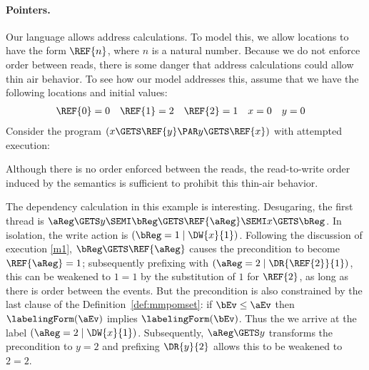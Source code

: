 \paragraph{Pointers.}
Our language allows address calculations.  To model this, we allow locations
to have the form $\REF{n}$, where $n$ is a natural number.  Because we do not
enforce order between reads, there is some danger that address calculations
could allow thin air behavior.   To see how our model addresses this, assume
that we have the following locations and initial values:
\begin{align*}
  \REF{0}&=0  &
  \REF{1}&=2  &
  \REF{2}&=1  &
  x &=0 &
  y &=0 
\end{align*}
Consider the program
\begin{math}
  (x\GETS\REF{y} \PAR y\GETS\REF{x})
\end{math}
with attempted execution:
\begin{tikzdisplay}[node distance=1em]
\end{tikzdisplay}
Although there is no order enforced between the reads, the read-to-write
order induced by the semantics is sufficient to prohibit this thin-air
behavior.

The dependency calculation in this example is interesting.  Desugaring, the
first thread is $\aReg\GETS y\SEMI \bReg\GETS \REF{\aReg}\SEMI x\GETS \bReg$.
In isolation, the write action is $(\bReg=1\mid\DW{x}{1})$.  Following the
discussion of execution \eqref{m1}, $\bReg\GETS \REF{\aReg}$ causes the
precondition to become $\REF{\aReg}=1$; subsequently prefixing with
$(\aReg=2\mid\DR{\REF{2}}{1})$, this can be weakened to $1=1$ by the
substitution of $1$ for $\REF{2}$, as long as there is order between the events.  But the precondition is also constrained
by the last clause of the Definition~\ref{def:mmpomset}:
 if $\bEv\le\aEv$ then $\labelingForm(\aEv)$ implies $\labelingForm(\bEv)$.
%
Thus the we arrive at the label $(\aReg=2\mid\DW{x}{1})$.  Subsequently,
$\aReg\GETS y$ transforms the precondition to $y=2$ and prefixing $\DR{y}{2}$
allows this to be weakened to $2=2$.

